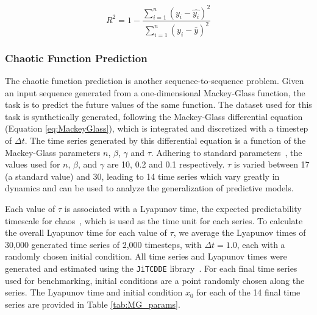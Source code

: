\begin{equation} \label{eq:r2}
    R^2 = 1 - \frac{\sum_{i=1}^{n} (y_i - \hat{y_i})^2}{\sum_{i=1}^{n} (y_i - \bar{y})^2}
\end{equation}

\subsubsection*{Chaotic Function Prediction}

The chaotic function prediction is another sequence-to-sequence problem. Given an input sequence generated from a one-dimensional Mackey-Glass function, the task is to predict the future values of the same function.
The dataset used for this task is synthetically generated, following the Mackey-Glass differential equation~\cite{mackey1977oscillation} (Equation \ref{eq:MackeyGlass}), which is integrated and discretized with a timestep of $\Delta t$. The time series generated by this differential equation is a function of the Mackey-Glass parameters $n$, $\beta$, $\gamma$ and $\tau$. Adhering to standard parameters~\cite{jaeger2004harnessing}, the values used for $n$, $\beta$, and $\gamma$ are 10, 0.2 and 0.1 respectively. $\tau$ is varied between 17 (a standard value) and 30, leading to 14 time series which vary greatly in dynamics and can be used to analyze the generalization of predictive models.

Each value of $\tau$ is associated with a Lyapunov time, the expected predictability timescale for chaos~\cite{gilpin2023largescale}, which is used as the time unit for each series. To calculate the overall Lyapunov time for each value of $\tau$, we average the Lyapunov times of 30,000 generated time series of 2,000 timesteps, with $\Delta t=1.0$, each with a randomly chosen initial condition.
All time series and Lyapunov times were generated and estimated using the \texttt{JiTCDDE} library~\cite{jitcxde}. 
For each final time series used for benchmarking, initial conditions are a point randomly chosen along the series.
The Lyapunov time and initial condition $x_0$ for each of the 14 final time series are provided in Table \ref{tab:MG_params}.

